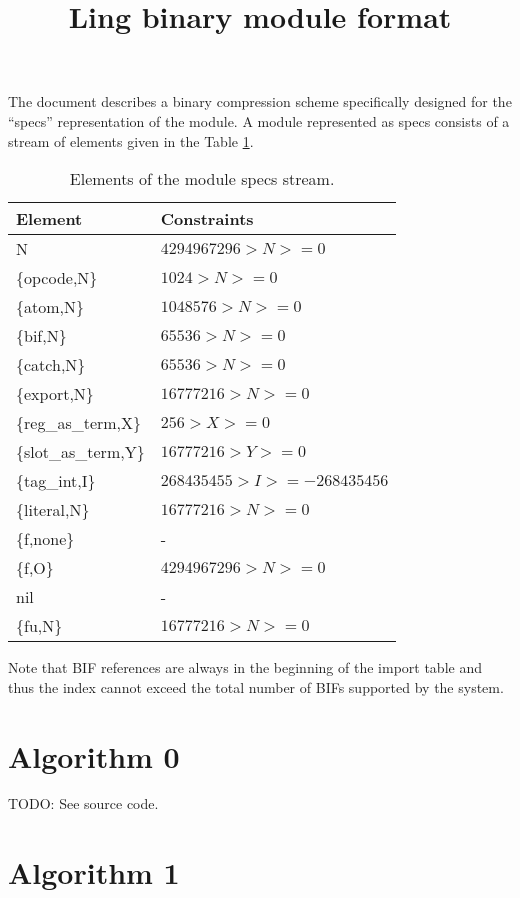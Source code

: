 \documentclass{article}
\title{Ling binary module format}
\begin{document}
\maketitle

The document describes a binary compression scheme specifically designed for the
``specs'' representation of the module.  A module represented as specs consists
of a stream of elements given in the Table \ref{tab:elts}.

\begin{table}[!ht]
\begin{tabular}{ll}
Element & Constraints \\
\hline
N & $4294967296 > N >= 0$ \\
\{opcode,N\} & $1024 > N >= 0$ \\
\{atom,N\} & $1048576 > N >= 0$ \\
\{bif,N\} & $65536 > N >= 0$ \\
\{catch,N\} & $65536 > N >= 0$ \\
\{export,N\} & $16777216 > N >= 0$ \\
\{reg\_as\_term,X\} & $256 > X >= 0$ \\
\{slot\_as\_term,Y\} & $16777216 > Y >= 0$ \\
\{tag\_int,I\} & $268435455 > I >= -268435456$ \\
\{literal,N\} & $16777216 > N >= 0$ \\
\{f,none\} & - \\
\{f,O\} & $4294967296 > N >= 0$ \\
nil & - \\
\{fu,N\} & $16777216 > N >= 0$ \\
\end{tabular}
\caption{Elements of the module specs stream\label{tab:elts}.}
\end{table}

Note that BIF references are always in the beginning of the import table and
thus the index cannot exceed the total number of BIFs supported by the system.

\section*{Algorithm 0}

TODO: See source code.

\section*{Algorithm 1}
\end{document}
